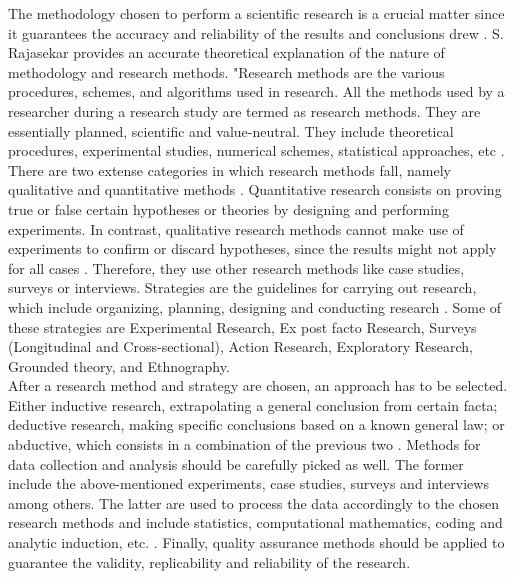
The methodology chosen to perform a scientific research is a crucial matter since it guarantees the accuracy and reliability of the results and conclusions drew \cite{haakansson}. S. Rajasekar provides an accurate theoretical explanation of the nature of methodology and research methods. "Research methods are the various procedures, schemes, and algorithms used in research. All the methods used by a researcher during a research study are termed as research methods. They are essentially planned, scientific and value-neutral. They include theoretical procedures, experimental studies, numerical schemes, statistical approaches, etc \cite{rajasekar2006}. There are two extense categories in which research methods fall, namely qualitative and quantitative methods \cite{jick1979mixing}. Quantitative research consists on proving true or false certain hypotheses or theories by designing and performing experiments. In contrast, qualitative research methods cannot make use of experiments to confirm or discard hypotheses, since the results might not apply for all cases \cite{jick1979mixing}. Therefore, they use other research methods like case studies, surveys or interviews. Strategies are the guidelines for carrying out research, which include organizing, planning, designing and conducting research \cite{haakansson}. Some of these strategies are Experimental Research, Ex post facto
Research, Surveys (Longitudinal and Cross-sectional), Action Research, Exploratory Research, Grounded theory, and Ethnography. \\

After a research method and strategy are chosen, an approach has to be selected. Either inductive research, extrapolating a general conclusion from certain facta; deductive research, making specific conclusions based on a known general law; or abductive, which consists in a combination of the previous two \cite{haakansson}. Methods for data collection and analysis should be carefully picked as well. The former include the above-mentioned experiments, case studies, surveys and interviews among others. The latter are used to process the data accordingly to the chosen research methods and include statistics, computational mathematics, coding and analytic induction, etc. \cite{rajasekar2006}. Finally, quality assurance methods should be applied to guarantee the validity, replicability and reliability of the research.\\

